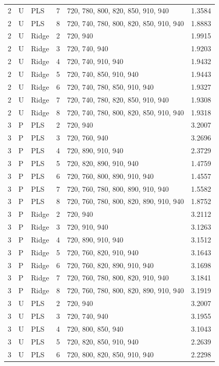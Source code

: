 \documentclass[10pt,a4paper]{article}
\begin{document}
\begin{longtable}{rllrlr}
2 & U & PLS & 7 & 720, 780, 800, 820, 850, 910, 940 & 1.3584 \\
2 & U & PLS & 8 & 720, 740, 780, 800, 820, 850, 910, 940 & 1.8883 \\
2 & U & Ridge & 2 & 720, 940 & 1.9915 \\
2 & U & Ridge & 3 & 720, 740, 940 & 1.9203 \\
2 & U & Ridge & 4 & 720, 740, 910, 940 & 1.9432 \\
2 & U & Ridge & 5 & 720, 740, 850, 910, 940 & 1.9443 \\
2 & U & Ridge & 6 & 720, 740, 780, 850, 910, 940 & 1.9327 \\
2 & U & Ridge & 7 & 720, 740, 780, 820, 850, 910, 940 & 1.9308 \\
2 & U & Ridge & 8 & 720, 740, 780, 800, 820, 850, 910, 940 & 1.9318 \\
3 & P & PLS & 2 & 720, 940 & 3.2007 \\
3 & P & PLS & 3 & 720, 760, 940 & 3.2696 \\
3 & P & PLS & 4 & 720, 890, 910, 940 & 2.3729 \\
3 & P & PLS & 5 & 720, 820, 890, 910, 940 & 1.4759 \\
3 & P & PLS & 6 & 720, 760, 800, 890, 910, 940 & 1.4557 \\
3 & P & PLS & 7 & 720, 760, 780, 800, 890, 910, 940 & 1.5582 \\
3 & P & PLS & 8 & 720, 760, 780, 800, 820, 890, 910, 940 & 1.8752 \\
3 & P & Ridge & 2 & 720, 940 & 3.2112 \\
3 & P & Ridge & 3 & 720, 910, 940 & 3.1263 \\
3 & P & Ridge & 4 & 720, 890, 910, 940 & 3.1512 \\
3 & P & Ridge & 5 & 720, 760, 820, 910, 940 & 3.1643 \\
3 & P & Ridge & 6 & 720, 760, 820, 890, 910, 940 & 3.1698 \\
3 & P & Ridge & 7 & 720, 760, 780, 800, 820, 910, 940 & 3.1841 \\
3 & P & Ridge & 8 & 720, 760, 780, 800, 820, 890, 910, 940 & 3.1919 \\
3 & U & PLS & 2 & 720, 940 & 3.2007 \\
3 & U & PLS & 3 & 720, 740, 940 & 3.1955 \\
3 & U & PLS & 4 & 720, 800, 850, 940 & 3.1043 \\
3 & U & PLS & 5 & 720, 820, 850, 910, 940 & 2.2639 \\
3 & U & PLS & 6 & 720, 800, 820, 850, 910, 940 & 2.2298 \\

\end{longtable}
\end{document}

